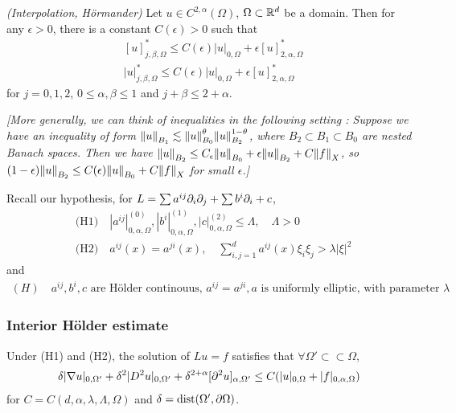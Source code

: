 \documentclass[10pt,a4paper]{article}
\begin{document}
 \emph{(Interpolation, H\"ormander)} Let $u\in C^{2, \alpha}(\Omega)$, $\Omega \subset\mathbb{R}^d$ be a domain. Then for any $\epsilon >0$, there is a constant $C(\epsilon)>0$ such that
\begin{align*}
&[u]^*_{j, \beta, \Omega} \leq C(\epsilon) |u|_{0, \Omega} + \epsilon [u]^*_{2, \alpha, \Omega} \\
&|u|^*_{j, \beta, \Omega} \leq C(\epsilon) |u|_{0, \Omega} + \epsilon [u]^*_{2, \alpha, \Omega}
\end{align*}
for $j=0,1,2$, $0\leq \alpha, \beta\leq 1$ and $j+\beta\leq 2+\alpha$.
\s

\emph{[More generally, we can think of inequalities in the following setting : Suppose we have an inequality of form $\snorms{u}{B_1} \lesssim \snorms{u}{B_0}^{\theta} \snorms{u}{B_2}^{1-\theta}$, where $B_2\subset B_1 \subset B_0$ are nested Banach spaces. Then we have $\snorms{u}{B_2} \leq C_{\epsilon} \snorms{u}{B_0} + \epsilon \snorms{u}{B_2} + C \snorms{f}{X}$, so $(1-\epsilon)\snorms{u}{B_2} \leq C(\epsilon) \snorms{u}{B_0} + C\snorms{f}{X}$ for small $\epsilon$.]}
\s

Recall our hypothesis, for $L = \sum a^{ij}\partial_i \partial_j + \sum b^i \partial_i +c$,
\begin{align*}
&\text{(H1)} \quad |a^{ij}|_{0, \alpha, \Omega}^{(0)}, |b^i|^{(1)}_{0, \alpha, \Omega}, |c|^{(2)}_{0, \alpha, \Omega}\leq \Lambda, \quad \Lambda>0 \\
&\text{(H2)} \quad a^{ij}(x) = a^{ji}(x), \quad \sum_{i,j=1}^d a^{ij}(x) \xi_i \xi_j > \lambda |\xi|^2
\end{align*}
and
\begin{align*}
(H) \quad a^{ij}, b^i, c \text{ are H\"older continouus, } a^{ij}=a^{ji}, a \text{ is uniformly elliptic, with parameter } \lambda
\end{align*}
\subsubsection*{Interior H\"older estimate}

\corr Under (H1) and (H2), the solution of $Lu =f$ satisfies that $\forall \Omega' \subset\subset \Omega$,
\begin{align*}
\delta |\nabla u |_{0, \Omega'} + \delta^2 |D^2 u|_{0, \Omega'} + \delta^{2+ \alpha}[\partial^2 u]_{\alpha, \Omega'}\leq C(|u|_{0, \Omega}+ |f|_{0, \alpha, \Omega})
\end{align*}
for $C = C(d, \alpha, \lambda, \Lambda, \Omega)$ and $\delta= \text{dist}(\Omega', \partial \Omega)$. 
\end{document}
